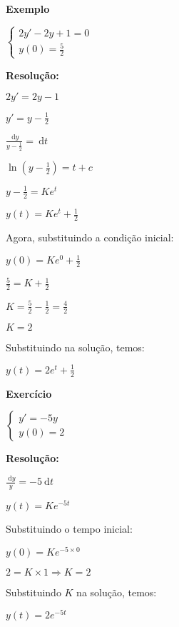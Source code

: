 \documentclass[a4paper]{article}
\newcommand{\ud}{\mathrm{\ d}}
\begin{document}
\newpage
\begin{multicols}{2}
{\bf Exemplo}

$
\left\{
  \begin{array}{l}
    2y'-2y +1 =0\\
    y(0)=\frac{5}{2}
  \end{array}
\right.
$

\bigskip
{\bf Resolução:}

$2y' = 2y - 1$

$y' = y - \frac{1}{2}$

\smallskip

$\frac{\ud y}{y - \frac{1}{2}} = \ud t$

\smallskip

$\ln \left(y - \frac{1}{2} \right) = t + c$

\smallskip

$y - \frac{1}{2}= K e^t$

\smallskip

$y(t) = K e^t + \frac{1}{2}$

\smallskip

Agora, substituindo a condição inicial:

\smallskip

$y(0) = Ke^0 +\frac{1}{2}$

\smallskip

$\frac{5}{2} = K + \frac{1}{2}$

\smallskip

$K=\frac{5}{2}-\frac{1}{2} = \frac{4}{2}$

\smallskip

$K=2$

Substituindo na solução, temos:

$y(t) = 2e^t +\frac{1}{2}$

\hrulefill

{\bf Exercício}

$
\left\{
  \begin{array}{l}
    y'=-5y\\
    y(0)=2
  \end{array}
\right.
$

\bigskip
{\bf Resolução:}

$\frac{\ud y}{y} = -5 \ud t$

$y(t) = Ke^{-5t}$

Substituindo o tempo inicial:

$y(0) = Ke^{-5 \times 0}$

$2 = K \times 1 \Rightarrow K= 2$

Substituindo $K$ na solução, temos:

$y(t) = 2e^{-5t}$
\end{multicols}
\end{document}
